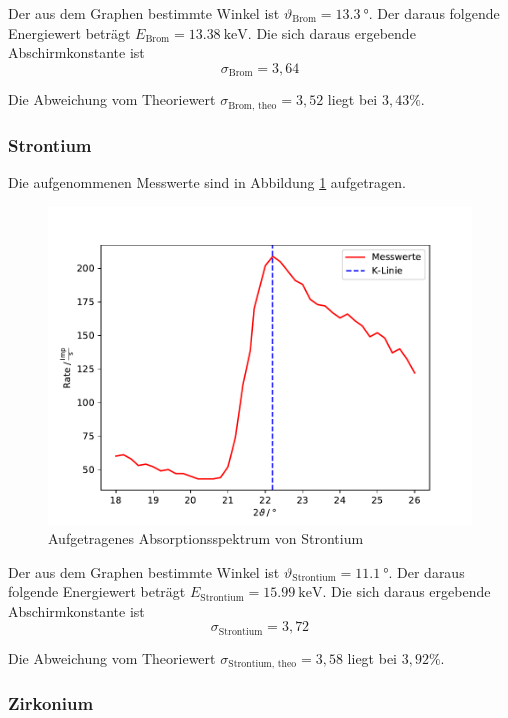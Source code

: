 Der aus dem Graphen bestimmte Winkel ist $\vartheta_\text{Brom} = \SI{13,3}{°}$. Der daraus folgende Energiewert beträgt $E_\text{Brom} = \SI{13,38}{\keV}$.
Die sich daraus ergebende Abschirmkonstante ist
\begin{equation*}
  \sigma_\text{Brom} = 3,64
\end{equation*}

Die Abweichung vom Theoriewert $\sigma_\text{Brom, theo} = 3,52$ liegt bei $3,43 \%$.

\subsubsection{Strontium}

Die aufgenommenen Messwerte sind in Abbildung \ref{fig:stro} aufgetragen.
\begin{figure}[H]
  \centering
  \includegraphics[width=\textwidth]{Plots/strontium.pdf}
  \caption{Aufgetragenes Absorptionsspektrum von Strontium}
  \label{fig:stro}
\end{figure}

Der aus dem Graphen bestimmte Winkel ist $\vartheta_\text{Strontium} = \SI{11,1}{°}$. Der daraus folgende Energiewert beträgt $E_\text{Strontium} = \SI{15,99}{\keV}$.
Die sich daraus ergebende Abschirmkonstante ist
\begin{equation*}
  \sigma_\text{Strontium} = 3,72
\end{equation*}

Die Abweichung vom Theoriewert $\sigma_\text{Strontium, theo} = 3,58$ liegt bei $3,92 \%$.

\subsubsection{Zirkonium \label{sec:zir}}

